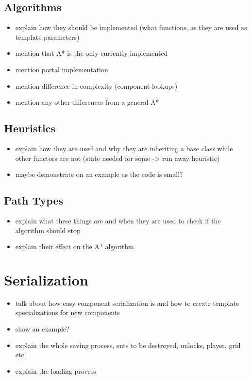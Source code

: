\subsection{Algorithms}

\begin{itemize}
    \item explain how they should be implemented (what functions, as they
        are used as template parameters)
    \item mention that A* is the only currently implemented
    \item mention portal implementation
    \item mention difference in complexity (component lookups)
    \item mention any other differences from a general A*
\end{itemize}

\subsection{Heuristics}

\begin{itemize}
    \item explain how they are used and why they are inheriting a base class
        while other functors are not (state needed for some -> run away heuristic)
    \item maybe demonstrate on an example as the code is small?
\end{itemize}

\subsection{Path Types}

\begin{itemize}
    \item explain what these things are and when they are used to check
        if the algorithm should stop
    \item explain their effect on the A* algorithm
\end{itemize}

\section{Serialization}

\begin{itemize}
    \item talk about how easy component serialization is and how
        to create template specializations for new components
    \item show an example?
    \item explain the whole saving process, ents to be destroyed, unlocks,
        player, grid etc.
    \item explain the loading process
\end{itemize}

